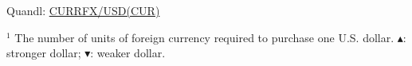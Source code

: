 \documentclass[final]{report}
\begin{document}
\hspace{-5mm} \indent \scriptsize{Quandl: \href{https://www.quandl.com/data/CURRFX}{CURRFX/USD(CUR)}}
	\vspace{2mm}
	
\hspace{-5mm} \indent \footnotesize{$^1$} The number of units of foreign currency required to purchase one U.S. dollar. \color{green!80!black} $ \blacktriangle $\normalcolor: stronger dollar; \color{red} $\blacktriangledown $\normalcolor: weaker dollar.
\end{document}

